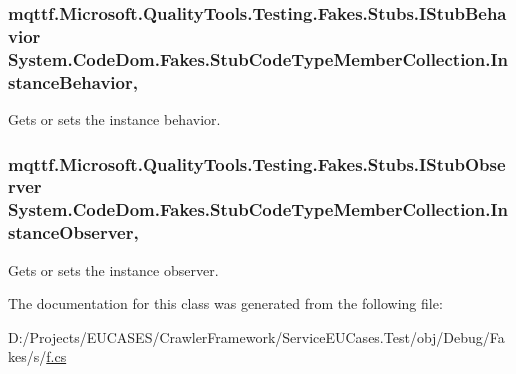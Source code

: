 \hypertarget{class_system_1_1_code_dom_1_1_fakes_1_1_stub_code_type_member_collection_a615cea43a403100f235ce8d1cf083ba4}{
\subsubsection[{Instance\-Behavior}]{\setlength{\rightskip}{0pt plus 5cm}mqttf.\-Microsoft.\-Quality\-Tools.\-Testing.\-Fakes.\-Stubs.\-I\-Stub\-Behavior System.\-Code\-Dom.\-Fakes.\-Stub\-Code\-Type\-Member\-Collection.\-Instance\-Behavior\hspace{0.3cm}{\ttfamily [get]}, {\ttfamily [set]}}}\label{class_system_1_1_code_dom_1_1_fakes_1_1_stub_code_type_member_collection_a615cea43a403100f235ce8d1cf083ba4}


Gets or sets the instance behavior.

\hypertarget{class_system_1_1_code_dom_1_1_fakes_1_1_stub_code_type_member_collection_a03b2f91168607fb9de8eb98cb73774be}{
\subsubsection[{Instance\-Observer}]{\setlength{\rightskip}{0pt plus 5cm}mqttf.\-Microsoft.\-Quality\-Tools.\-Testing.\-Fakes.\-Stubs.\-I\-Stub\-Observer System.\-Code\-Dom.\-Fakes.\-Stub\-Code\-Type\-Member\-Collection.\-Instance\-Observer\hspace{0.3cm}{\ttfamily [get]}, {\ttfamily [set]}}}\label{class_system_1_1_code_dom_1_1_fakes_1_1_stub_code_type_member_collection_a03b2f91168607fb9de8eb98cb73774be}


Gets or sets the instance observer.



The documentation for this class was generated from the following file\-:\begin{DoxyCompactItemize}
\item 
D\-:/\-Projects/\-E\-U\-C\-A\-S\-E\-S/\-Crawler\-Framework/\-Service\-E\-U\-Cases.\-Test/obj/\-Debug/\-Fakes/s/\hyperlink{s_2f_8cs}{f.\-cs}\end{DoxyCompactItemize}
